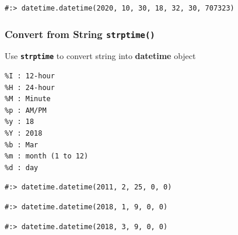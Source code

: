 \documentclass[
]{book}
\newenvironment{Shaded}{\begin{snugshade}}{\end{snugshade}}
\newcommand{\NormalTok}[1]{#1}
\newcommand{\SpecialCharTok}[1]{\textcolor[rgb]{0,0,0}{#1}}
\newcommand{\StringTok}[1]{\textcolor[rgb]{0.5,0.5,0.5}{#1}}
\begin{document}
\begin{verbatim}
#:> datetime.datetime(2020, 10, 30, 18, 32, 30, 707323)
\end{verbatim}

\hypertarget{convert-from-string-strptime}{%
\subsubsection{\texorpdfstring{Convert from String \texttt{strptime()}}{Convert from String strptime()}}\label{convert-from-string-strptime}}

Use \textbf{\texttt{strptime}} to convert string into \textbf{datetime} object

\begin{verbatim}
%I : 12-hour
%H : 24-hour
%M : Minute
%p : AM/PM
%y : 18
%Y : 2018
%b : Mar
%m : month (1 to 12)
%d : day
\end{verbatim}

\begin{Shaded}
\end{Shaded}

\begin{verbatim}
#:> datetime.datetime(2011, 2, 25, 0, 0)
\end{verbatim}

\begin{Shaded}
\end{Shaded}

\begin{verbatim}
#:> datetime.datetime(2018, 1, 9, 0, 0)
\end{verbatim}

\begin{Shaded}
\end{Shaded}

\begin{verbatim}
#:> datetime.datetime(2018, 3, 9, 0, 0)
\end{verbatim}
\end{document}
